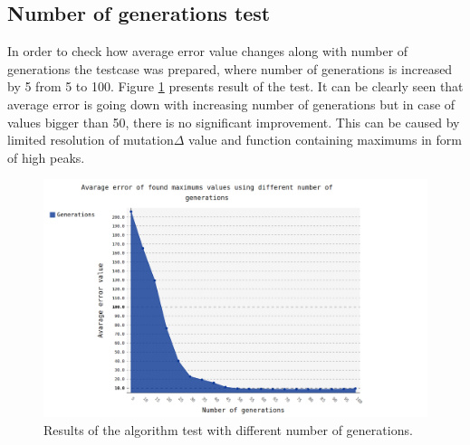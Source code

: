 \documentclass[a4paper]{article}
\begin{document}
\subsection{Number of generations test}
In order to check how average error value changes along with number of generations the testcase was prepared, where number of generations is increased by 5 from 5 to 100.
Figure \ref{generations} presents result of the test. It can be clearly seen that average error is going down with increasing number of generations but in case of values bigger than 
50, there is no significant improvement. This can be caused by limited resolution of mutation$\Delta$ value and function containing maximums in form of high peaks.
\vfill
\begin{figure}[ht]
	\centering
	\includegraphics[scale=0.36,keepaspectratio=true]{generations.png}	
	\caption{Results of the algorithm test with different number of generations.}
	\label{generations}
\end{figure}
\vfill
\clearpage
\end{document}
